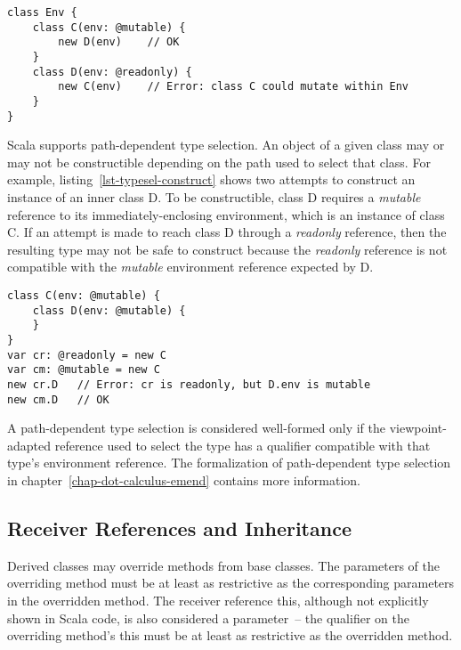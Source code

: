 \begin{lstlisting}[caption={Environment References and Object Construction},float={htp},label={lst-object-construction}]
class Env {
	class C(env: @mutable) {
		new D(env)    // OK
	}
	class D(env: @readonly) {
		new C(env)    // Error: class C could mutate within Env
	}
}
\end{lstlisting}

Scala supports path-dependent type selection.
An object of a given class may or may not be constructible depending on
the path used to select that class.
For example, listing~\ref{lst-typesel-construct} shows two attempts to
construct an instance of an inner class {\cd D}.
To be constructible, class {\cd D} requires a {\em mutable} reference to its immediately-enclosing
environment, which is an instance of class {\cd C}.
If an attempt is made to reach class {\cd D} through a {\em readonly} reference,
then the resulting type may not be safe to construct because the {\em readonly}
reference is not compatible with the {\em mutable} environment reference
expected by {\cd D}.

\begin{lstlisting}[caption={Type Selection and Object Construction},float={htp},label={lst-typesel-construct}]
class C(env: @mutable) {
	class D(env: @mutable) {
	}
}
var cr: @readonly = new C
var cm: @mutable = new C
new cr.D   // Error: cr is readonly, but D.env is mutable
new cm.D   // OK
\end{lstlisting}

A path-dependent type selection is considered well-formed only if the
viewpoint-adapted reference used to select the type has a qualifier compatible
with that type's environment reference. The formalization of path-dependent type
selection in chapter~\ref{chap-dot-calculus-emend} contains more information.

\subsection{Receiver References and Inheritance} \label{sec-rcv-inherit}

Derived classes may override methods from base classes.
The parameters of the overriding method must be at least as restrictive
as the corresponding parameters in the overridden method.
The receiver reference {\cd this}, although not explicitly shown in Scala
code, is also considered a parameter~-- the qualifier on the overriding
method's {\cd this} must be at least as restrictive as the overridden method.

